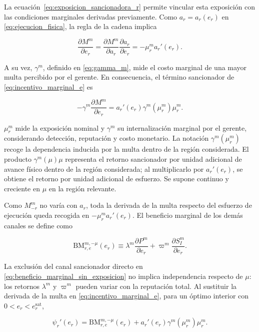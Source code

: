 La ecuación~\eqref{eq:exposicion_sancionadora_r} permite vincular esta exposición con las condiciones marginales derivadas previamente. Como \(a_r=a_r(e_r)\) en \eqref{eq:ejecucion_fisica}, la regla de la cadena implica

\begin{equation}
\frac{\partial M^m}{\partial e_r}
=
\frac{\partial M^m}{\partial a_r}
\frac{\partial a_r}{\partial e_r}
=
-\mu_r^m a_r'(e_r).
\end{equation}

A su vez, \(\gamma^m\), definido en \eqref{eq:gamma_m}, mide el costo marginal de una mayor multa percibido por el gerente. En consecuencia, el término sancionador de \eqref{eq:incentivo_marginal_e} es

\begin{equation}
-\gamma^m
\frac{\partial M^m}{\partial e_r}
=
a_r'(e_r)\gamma^m(\mu_r^m)\mu_r^m.
\end{equation}

\(\mu_r^m\) mide la exposición nominal y \(\gamma^m\) su internalización marginal por el gerente, considerando detección, reputación y costo monetario. La notación \(\gamma^m(\mu_r^m)\) recoge la dependencia inducida por la multa dentro de la región considerada. El producto \(\gamma^m(\mu)\mu\) representa el retorno sancionador por unidad adicional de avance físico dentro de la región considerada; al multiplicarlo por \(a_r'(e_r)\), se obtiene el retorno por unidad adicional de esfuerzo. Se supone continuo y creciente en \(\mu\) en la región relevante.

Como \(M_{-r}^m\) no varía con \(a_r\), toda la derivada de la multa respecto del esfuerzo de ejecución queda recogida en \(-\mu_r^m a_r'(e_r)\). El beneficio marginal de los demás canales se define como

\begin{equation}
\label{eq:beneficio_marginal_sin_exposicion}
\mathrm{BM}_{r,e}^{m,-\mu}(e_r)
\equiv\lambda^m\frac{\partial P^m}{\partial e_r}
+\varpi^m\frac{\partial S_I^m}{\partial e_r}.
\end{equation}

La exclusión del canal sancionador directo en \eqref{eq:beneficio_marginal_sin_exposicion} no implica independencia respecto de \(\mu\): los retornos \(\lambda^m\) y \(\varpi^m\) pueden variar con la reputación total. Al sustituir la derivada de la multa en \eqref{eq:incentivo_marginal_e}, para un óptimo interior con \(0<e_r<e_r^{\mathrm{sat}}\),

\begin{equation}
\label{eq:foc_probabilidad_cumplimiento}
\psi_r'(e_r)
=
\mathrm{BM}_{r,e}^{m,-\mu}(e_r)
+
a_r'(e_r)
\gamma^m(\mu_r^m)\mu_r^m.
\end{equation}

